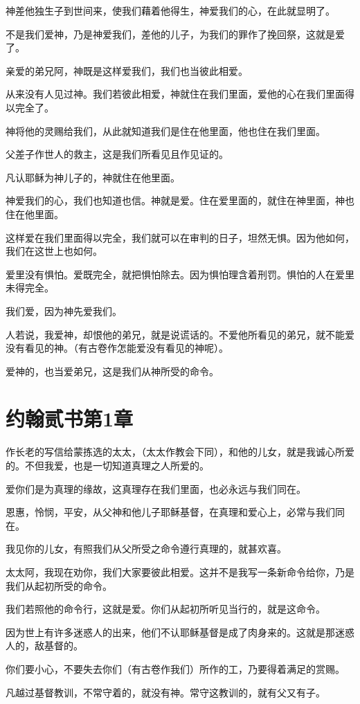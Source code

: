 \documentclass[12pt,oneside]{book}
\begin{document}
神差他独生子到世间来，使我们藉着他得生，神爱我们的心，在此就显明了。

不是我们爱神，乃是神爱我们，差他的儿子，为我们的罪作了挽回祭，这就是爱了。

亲爱的弟兄阿，神既是这样爱我们，我们也当彼此相爱。

从来没有人见过神。我们若彼此相爱，神就住在我们里面，爱他的心在我们里面得以完全了。

神将他的灵赐给我们，从此就知道我们是住在他里面，他也住在我们里面。

父差子作世人的救主，这是我们所看见且作见证的。

凡认耶稣为神儿子的，神就住在他里面。

神爱我们的心，我们也知道也信。神就是爱。住在爱里面的，就住在神里面，神也住在他里面。

这样爱在我们里面得以完全，我们就可以在审判的日子，坦然无惧。因为他如何，我们在这世上也如何。

爱里没有惧怕。爱既完全，就把惧怕除去。因为惧怕理含着刑罚。惧怕的人在爱里未得完全。

我们爱，因为神先爱我们。

人若说，我爱神，却恨他的弟兄，就是说谎话的。不爱他所看见的弟兄，就不能爱没有看见的神。（有古卷作怎能爱没有看见的神呢）。

爱神的，也当爱弟兄，这是我们从神所受的命令。

\chapter{约翰贰书第1章}
作长老的写信给蒙拣选的太太，（太太作教会下同），和他的儿女，就是我诚心所爱的。不但我爱，也是一切知道真理之人所爱的。

爱你们是为真理的缘故，这真理存在我们里面，也必永远与我们同在。

恩惠，怜悯，平安，从父神和他儿子耶稣基督，在真理和爱心上，必常与我们同在。

我见你的儿女，有照我们从父所受之命令遵行真理的，就甚欢喜。

太太阿，我现在劝你，我们大家要彼此相爱。这并不是我写一条新命令给你，乃是我们从起初所受的命令。

我们若照他的命令行，这就是爱。你们从起初所听见当行的，就是这命令。

因为世上有许多迷惑人的出来，他们不认耶稣基督是成了肉身来的。这就是那迷惑人的，敌基督的。

你们要小心，不要失去你们（有古卷作我们）所作的工，乃要得着满足的赏赐。

凡越过基督教训，不常守着的，就没有神。常守这教训的，就有父又有子。
\end{document}
